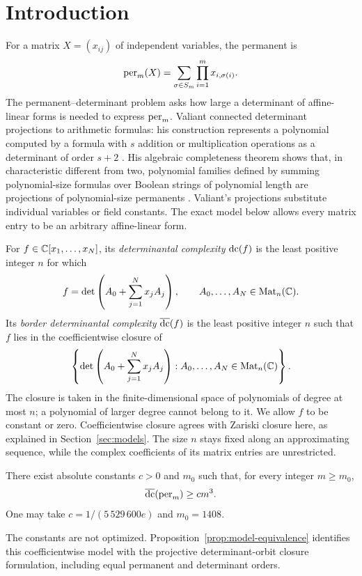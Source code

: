 \section{Introduction}
\label{sec:introduction}

For a matrix $X=(x_{ij})$ of independent variables, the permanent is
\[
 \operatorname{per}_m(X)=\sum_{\sigma\in S_m}\prod_{i=1}^m x_{i,\sigma(i)}.
\]
The permanent--determinant problem asks how large a determinant of
affine-linear forms is needed to express $\operatorname{per}_m$. Valiant connected
determinant projections to arithmetic formulas: his construction represents
a polynomial computed by a formula with $s$ addition or multiplication
operations as a determinant of order $s+2$
\cite[Theorem~1]{Valiant1979Algebra}. His algebraic completeness theorem
shows that, in characteristic different from two, polynomial families
defined by summing polynomial-size formulas over Boolean strings of
polynomial length are projections of polynomial-size permanents
\cite[Theorem~2]{Valiant1979Algebra}. Valiant's projections substitute
individual variables or field constants. The exact model below allows
every matrix entry to be an arbitrary affine-linear form.

For $f\in\mathbb C[x_1,\ldots,x_N]$, its \emph{determinantal complexity}
$\operatorname{dc}(f)$ is the least positive integer $n$ for which
\[
 f=\det\left(A_0+\sum_{j=1}^N x_jA_j\right),
 \qquad A_0,\ldots,A_N\in\operatorname{Mat}_n(\mathbb C).
\]
Its \emph{border determinantal complexity} $\operatorname{\overline{dc}}(f)$ is the least positive
integer $n$ such that $f$ lies in the coefficientwise closure of
\begin{equation}
 \left\{\det\left(A_0+\sum_{j=1}^N x_jA_j\right):
 A_0,\ldots,A_N\in\operatorname{Mat}_n(\mathbb C)\right\}.
 \label{eq:border-definition}
\end{equation}
The closure is taken in the finite-dimensional space of polynomials of
degree at most $n$; a polynomial of larger degree cannot belong to it.
We allow $f$ to be constant or zero. Coefficientwise closure agrees with
Zariski closure here, as explained in Section~\ref{sec:models}. The size
$n$ stays fixed along an approximating sequence, while the complex
coefficients of its matrix entries are unrestricted.

\begin{theorem}
\label{thm:main}
There exist absolute constants $c>0$ and $m_0$ such that, for every integer
$m\ge m_0$,
\[
 \operatorname{\overline{dc}}(\operatorname{per}_m)\ge c m^3.
\]
One may take $c=1/(5\,529\,600e)$ and $m_0=1408$.
\end{theorem}

The constants are not optimized. Proposition~\ref{prop:model-equivalence}
identifies this coefficientwise model with the projective determinant-orbit
closure formulation, including equal permanent and determinant orders.

